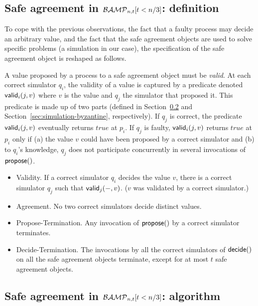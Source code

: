 \documentclass[11pt,letterpaper]{article}
\newcommand{\BM}{{\cal BAMP}_{n,t}}
\begin{document}
\subsection{Safe agreement in  $\BM[t<n/3]$: definition}
\label{sec:spec-Byzantine-SA}
To cope with  the previous observations, the fact that
a faulty process may decide an arbitrary  value,
and the fact  that the safe agreement objects are used  to solve
specific problems (a simulation in our case),
the specification of the safe agreement object is reshaped as follows.

A value proposed by a process to a safe agreement object must be
{\it valid}. At each correct simulator $q_i$, the validity of a value is 
captured by a predicate denoted ${\sf valid}_i(j,v)$
where $v$ is the value and $q_j$ the simulator that proposed it.
This predicate is made up of two parts (defined in Section~\ref{sec:is-valid} 
and  Section~\ref{sec:simulation-byzantine}, respectively).
If $q_j$ is correct, the predicate ${\sf valid}_i(j,v)$ eventually 
returns $\mathit{true}$ at $p_i$. If
$q_j$ is faulty,  ${\sf valid}_i(j,v)$  returns  $\mathit{true}$ at $p_i$
only if
 (a) the value $v$  could have been proposed by a correct simulator and (b) 
 to $q_i$'s knowledge, $q_j$ does not participate concurrently in several 
invocations of  ${\sf propose}()$.
\vspace{-0.1cm}
\begin{itemize}
\item Validity.
If a correct simulator $q_i$ decides the value $v$, there is 
a correct simulator $q_j$ such that ${\sf valid}_j(-,v)$.
($v$ was validated by a correct simulator.)
\vspace{-0.2cm}
\item Agreement. No two correct simulators decide distinct values.
\vspace{-0.2cm}
\item Propose-Termination.
Any invocation of  ${\sf propose}()$ by a correct simulator terminates.
\vspace{-0.2cm}
\item Decide-Termination.
The invocations by all the correct simulators  of ${\sf  decide}()$
on all the safe agreement objects terminate, except for at most $t$
safe agreement objects.
\end{itemize}


\subsection{Safe agreement in  $\BM[t<n/3]$: algorithm}
\label{sec:is-valid}
\end{document}
